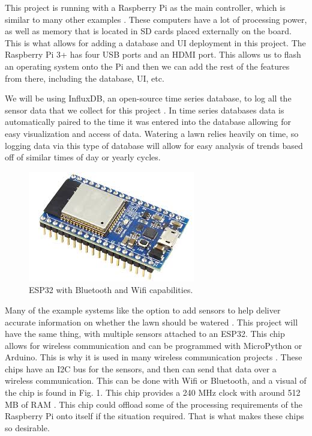 \documentclass[letterpaper, 10 pt, conference]{ieeeconf}  %
\begin{document}
This project is running with a Raspberry Pi as the main controller, which is similar to many other examples \cite{SIP}. These computers have a lot of processing power, as well as memory that is located in SD cards placed externally on the board. This is what allows for adding a database and UI deployment in this project. The Raspberry Pi 3+ has four USB ports and an HDMI port. This allows us to flash an operating system onto the Pi and then we can add the rest of the features from there, including the database, UI, etc. 

We will be using InfluxDB, an open-source time series database, to log all the sensor data that we collect for this project \cite{influxdb}. In time series databases data is automatically paired to the time it was entered into the database allowing for easy visualization and access of data. Watering a lawn relies heavily on time, so logging data via this type of database will allow for easy analysis of trends based off of similar times of day or yearly cycles.

\begin{figure}
    \centering
    \includegraphics[scale=.5]{ESP32.jpg}
    \caption{ESP32 with Bluetooth and Wifi capabilities.}
    \label{fig:esp_label}
\end{figure}

Many of the example systems like the option to add sensors to help deliver accurate information on whether the lawn should be watered \cite{OpenSprinkler}. This project will have the same thing, with multiple sensors attached to an ESP32. This chip allows for wireless communication and can be programmed with MicroPython or Arduino. This is why it is used in many wireless communication projects \cite{OpenSprinkler}. These chips have an I2C bus for the sensors, and then can send that data over a wireless communication. This can be done with Wifi or Bluetooth, and a visual of the chip is found in Fig. 1. This chip provides a 240 MHz clock with around 512 MB of RAM \cite{micropy}. This chip could offload some of the processing requirements of the Raspberry Pi onto itself if the situation required. That is what makes these chips so desirable. 
\end{document}
